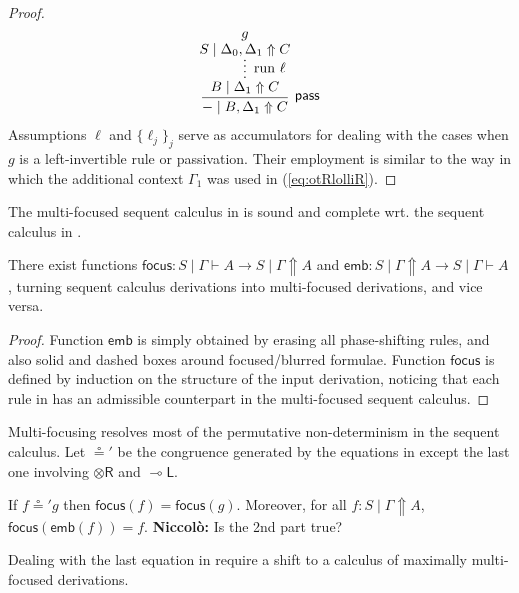 \documentclass[runningheads]{llncs}
\newcommand{\tr}{\otimes \mathsf{R}}
\newcommand{\lleft}{{\multimap}\mathsf{L}}
\newcommand{\pass}{\mathsf{pass}}
\newcommand{\otR}{\tr}
\newcommand{\lolliL}{\lleft}
\renewcommand{\L}{\mathsf{L}}
\newcommand{\niccolo}[1]{{\color{red}\textbf{Niccol{\`o}: }#1}}
\newcommand{\up}{\Uparrow}
\newcommand{\focus}{\mathsf{focus}}
\newcommand{\emb}{\mathsf{emb}}
\begin{document}
\begin{proof}
\[\begin{array}{cc}
{{{{%
             \infer[\pass]{- \mid B,\Delta_1 \up C}{
               \infer*[\text{run } \ell]{B \mid \Delta_1 \up C}{
                 \deduce{S \mid \Delta_0,\Delta_1 \up C}{g}
               }}}}}}
  \end{array}
  \]
  Assumptions $\ell$ and $\{\ell_j\}_j$ serve as accumulators for dealing with the cases when $g$ is a left-invertible rule or passivation. Their employment is similar to the way in which the additional context $\Gamma_1$ was used in (\ref{eq:otRlolliR}).
\end{proof}
The multi-focused sequent calculus in  is sound and complete wrt. the sequent calculus in .
\begin{theorem}
  There exist functions $\focus : S \mid \Gamma \vdash A \to S \mid \Gamma \up A$  and $\emb: S \mid \Gamma \up A \to S \mid \Gamma \vdash A$, turning sequent calculus derivations into multi-focused derivations, and vice versa.
\end{theorem}
\begin{proof}
Function $\emb$ is simply obtained by erasing all phase-shifting rules, and also solid and dashed boxes around focused/blurred formulae. Function $\focus$ is defined by induction on the structure of the input derivation, noticing that each rule in  has an admissible counterpart in the multi-focused sequent calculus.
\end{proof}
Multi-focusing resolves most of the permutative non-determinism in the sequent calculus. Let $\circeq'$ be the congruence generated by the equations in  except the last one involving $\otR$ and $\lolliL$.
\begin{proposition}
  If $f \circeq' g$ then $\focus(f) = \focus(g)$. Moreover, for all $f : S \mid \Gamma \up A$, $\focus(\emb(f)) = f$.
  \niccolo{Is the 2nd part true?}
\end{proposition}
Dealing with the last equation in  require a shift to a calculus of maximally multi-focused derivations.
\end{document}
